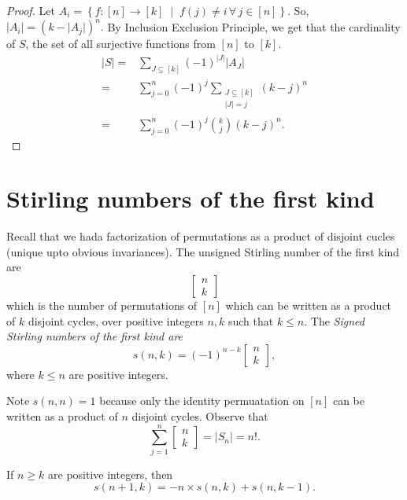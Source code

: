 \begin{proof}
Let $A_i = \left\{ f \colon [n] \to [k] \; \middle| \;
f(j) \not =  i \, \forall \, j \in [n] \right\}.$
So, $ \lvert A_i \rvert = (k - \lvert A_j \rvert )^n.$
By Inclusion Exclusion Principle, we get that the cardinality of $S$, 
the set of all surjective functions from $[n]$ to $[k].$
\begin{align*}
	\lvert S \rvert ={}& \sum_{J \subseteq [k]} (-1)^{ \lvert J \rvert} \lvert A_J \rvert \\
	={}& \sum_{j=0}^{n} (-1)^j \sum_{\substack{J \subseteq [k] \\
\lvert J \rvert = j }} (k - j)^n \\
	={}& \sum_{j=0}^{n} (-1)^j \binom{k}{j} (k-j)^n.
\end{align*}
\end{proof}


\section{Stirling numbers of the first kind}
Recall that we hada  factorization of permutations as a product of disjoint cucles (unique upto obvious invariances).
The unsigned Stirling number of the first kind 
are 
$$ \begin{bmatrix} n\\k \end{bmatrix} $$
which is the number of permutations of $[n]$ which can be written as a product of $k$ disjoint cycles, over positive integers $n,k$ such that $k \leq n .$
The \emph{Signed Stirling numbers of the first kind are} $$s(n,k) = (-1)^{n-k} \begin{bmatrix} n\\k \end{bmatrix} , $$
where $k \leq n$ are positive integers.

Note $s(n,n) = 1$ because only the identity permuatation on $[n]$ can be written as a product of $n$ disjoint cycles. Observe that
$$ \sum_{j=1}^{n}  \begin{bmatrix} n \\ k \end{bmatrix} 
= \lvert S_n \rvert = n!. $$

\begin{theorem}
	If $n \geq k$ are positive integers, then 
	$$ s(n+1, k) = - n \times s(n,k) + s(n, k-1). $$
\end{theorem}

